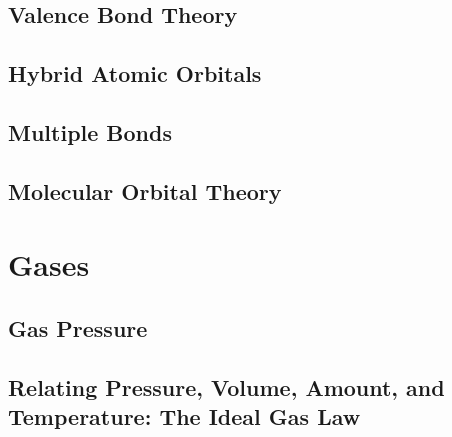 \documentclass[12pt, openany, letterpaper]{memoir}
\begin{document}
\section{Valence Bond Theory}

\section{Hybrid Atomic Orbitals}

\section{Multiple Bonds}

\section{Molecular Orbital Theory}

\chapter{Gases}

\section{Gas Pressure}

\section{Relating Pressure, Volume, Amount, and Temperature: The Ideal Gas Law}
\end{document}
